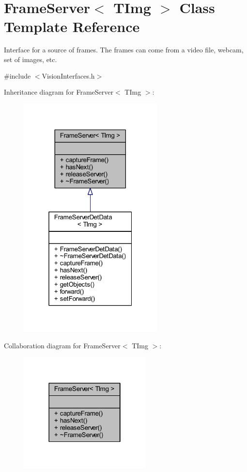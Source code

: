 \hypertarget{class_vision_core_1_1_interfaces_1_1_frame_server}{}\section{Frame\+Server$<$ T\+Img $>$ Class Template Reference}
\label{class_vision_core_1_1_interfaces_1_1_frame_server}


Interface for a source of frames. The frames can come from a video file, webcam, set of images, etc.  




{\ttfamily \#include $<$Vision\+Interfaces.\+h$>$}



Inheritance diagram for Frame\+Server$<$ T\+Img $>$\+:
\nopagebreak
\begin{figure}[H]
\begin{center}
\leavevmode
\includegraphics[width=208pt]{class_vision_core_1_1_interfaces_1_1_frame_server__inherit__graph}
\end{center}
\end{figure}


Collaboration diagram for Frame\+Server$<$ T\+Img $>$\+:
\nopagebreak
\begin{figure}[H]
\begin{center}
\leavevmode
\includegraphics[width=190pt]{class_vision_core_1_1_interfaces_1_1_frame_server__coll__graph}
\end{center}
\end{figure}
